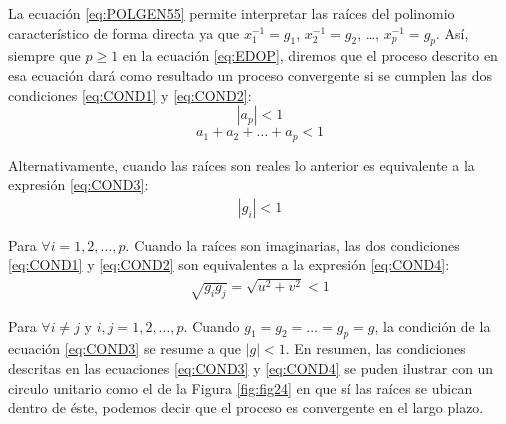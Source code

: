 \documentclass[
]{book}
\begin{document}
La ecuación \eqref{eq:POLGEN55} permite interpretar las raíces del polinomio característico de forma directa ya que \(x^{-1}_1 = g_1\), \(x^{-1}_2 = g_2\), \ldots, \(x^{-1}_p = g_p\). Así, siempre que \(p \geq 1\) en la ecuación \eqref{eq:EDOP}, diremos que el proceso descrito en esa ecuación dará como resultado un proceso convergente si se cumplen las dos condiciones \eqref{eq:COND1} y \eqref{eq:COND2}:
\begin{equation}
    |a_p| < 1  
    \label{eq:COND1}
\end{equation}
\begin{equation}
    a_1 + a_2 + \ldots + a_p < 1
    \label{eq:COND2}
\end{equation}

Alternativamente, cuando las raíces son reales lo anterior es equivalente a la expresión \eqref{eq:COND3}:
\begin{eqnarray}
    |g_i| < 1
    \label{eq:COND3}
\end{eqnarray}

Para \(\forall i = 1, 2, \ldots, p\). Cuando la raíces son imaginarias, las dos condiciones \eqref{eq:COND1} y \eqref{eq:COND2} son equivalentes a la expresión \eqref{eq:COND4}:
\begin{eqnarray}
    \sqrt{g_i g_j} = \sqrt{u^2 + v^2} < 1 
    \label{eq:COND4}
\end{eqnarray}

Para \(\forall i \neq j\) y \(i, j = 1, 2, \ldots, p\). Cuando \(g_1 = g_2 = \ldots = g_p = g\), la condición de la ecuación \eqref{eq:COND3} se resume a que \(|g| < 1\). En resumen, las condiciones descritas en las ecuaciones \eqref{eq:COND3} y \eqref{eq:COND4} se puden ilustrar con un circulo unitario como el de la Figura \ref{fig:fig24} en que sí las raíces se ubican dentro de éste, podemos decir que el proceso es convergente en el largo plazo.
\end{document}
